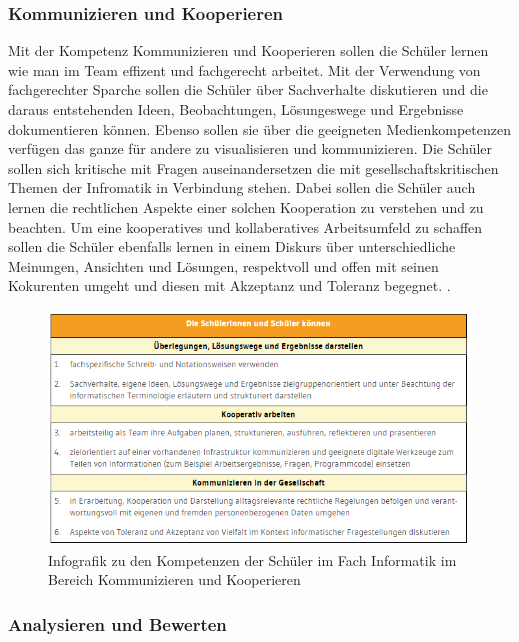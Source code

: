 \subsubsection{Kommunizieren und Kooperieren}

Mit der Kompetenz Kommunizieren und Kooperieren  sollen die Schüler lernen wie man im Team effizent und fachgerecht arbeitet. Mit der Verwendung von fachgerechter Sparche sollen die Schüler über Sachverhalte diskutieren und die daraus entstehenden Ideen, Beobachtungen, Lösungeswege und Ergebnisse dokumentieren können. Ebenso sollen sie über die geeigneten Medienkompetenzen verfügen das ganze für andere zu visualisieren und kommunizieren. Die Schüler sollen sich kritische mit Fragen auseinandersetzen die mit gesellschaftskritischen Themen der Infromatik in Verbindung stehen. Dabei sollen die Schüler auch lernen die rechtlichen Aspekte einer solchen Kooperation zu verstehen und zu beachten. Um eine kooperatives und kollaberatives Arbeitsumfeld zu schaffen sollen die Schüler ebenfalls lernen in einem Diskurs über unterschiedliche Meinungen, Ansichten und Lösungen, respektvoll und offen mit seinen Kokurenten umgeht und diesen mit Akzeptanz und Toleranz begegnet.
\cite{Model}.

\begin{figure}[H]
	\centering
	\includegraphics[width=\textwidth,height=\textheight,keepaspectratio]{images/team.png}
	\caption{Infografik zu den Kompetenzen der Schüler im Fach Informatik im Bereich Kommunizieren und Kooperieren}
	\label{Kommunizieren und Kooperieren Infografik}
\end{figure}

\subsubsection{Analysieren und Bewerten}

